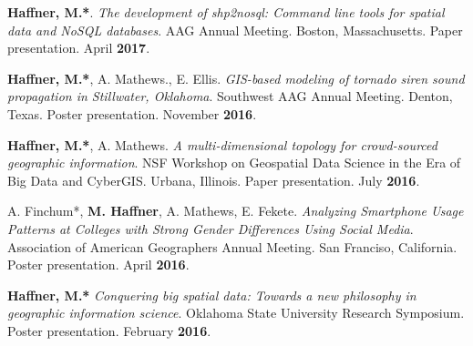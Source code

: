 \begin{cventries}
   \cventry
      {}
      {}
      {}
      {}
      {
        \begin{cvitems}
          \vspace{-2mm}
        \item {\textbf{Haffner, M.*}.
            \textit{The development of shp2nosql: Command line tools for spatial
              data and NoSQL databases}. AAG Annual Meeting. Boston,
            Massachusetts. Paper presentation. April \textbf{2017}.}
          \end{cvitems}
          }

   \cventry
      {}
      {}
      {}
      {}
      {
        \begin{cvitems}
          \vspace{-2mm}
            \item {\textbf{Haffner, M.*}, A. Mathews., E. Ellis.
                \textit{GIS-based modeling of tornado siren sound propagation in
                  Stillwater, Oklahoma}. Southwest AAG Annual Meeting. Denton,
                Texas. Poster  presentation. November \textbf{2016}.}
            \end{cvitems}
          }

   \cventry
      {}
      {}
      {}
      {}
      {
        \begin{cvitems}
          \vspace{-2mm}
        \item {\textbf{Haffner, M.*}, A. Mathews. \textit{A multi-dimensional topology for crowd-sourced geographic information}. NSF Workshop on Geospatial Data Science in the Era of Big Data and CyberGIS. Urbana, Illinois. Paper presentation. July \textbf{2016}.} 
          \end{cvitems}
        }

   \cventry
      {}
      {}
      {}
      {}
      {
        \begin{cvitems}
          \vspace{-2mm}
        \item A. Finchum*, {\textbf{M. Haffner}, A. Mathews, E. Fekete. \textit{Analyzing Smartphone Usage Patterns at Colleges with Strong Gender Differences Using Social Media}. Association of American Geographers Annual Meeting. San Franciso, California. Poster presentation. April \textbf{2016}.} 
            \end{cvitems}
            }

   \cventry
      {}
      {}
      {}
      {}
      {
        \begin{cvitems}
          \vspace{-2mm}
            \item {\textbf{Haffner, M.*} \textit{Conquering big spatial data: Towards a new philosophy in geographic information science}. Oklahoma State University Research Symposium. Poster presentation. February \textbf{2016}.}   
              \end{cvitems}
            }


\end{cventries}
